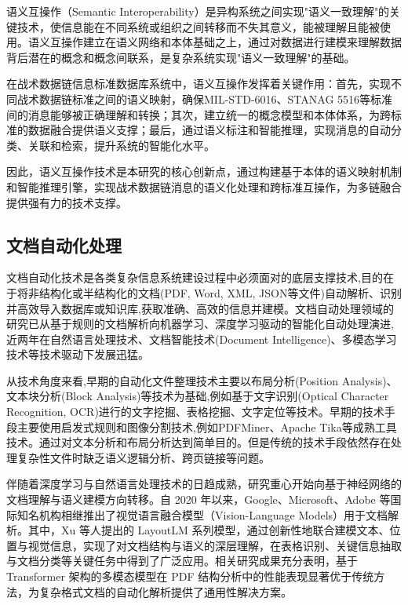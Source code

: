 语义互操作（Semantic Interoperability）是异构系统之间实现"语义一致理解"的关键技术，使信息能在不同系统或组织之间转移而不失其意义，能被理解且能被使用。语义互操作建立在语义网络和本体基础之上，通过对数据进行建模来理解数据背后潜在的概念和概念间联系，是复杂系统实现"语义一致理解"的基础。

在战术数据链信息标准数据库系统中，语义互操作发挥着关键作用：首先，实现不同战术数据链标准之间的语义映射，确保MIL-STD-6016、STANAG 5516等标准间的消息能够被正确理解和转换；其次，建立统一的概念模型和本体体系，为跨标准的数据融合提供语义支撑；最后，通过语义标注和智能推理，实现消息的自动分类、关联和检索，提升系统的智能化水平。

因此，语义互操作技术是本研究的核心创新点，通过构建基于本体的语义映射机制和智能推理引擎，实现战术数据链消息的语义化处理和跨标准互操作，为多链融合提供强有力的技术支撑。


\subsection{文档自动化处理}

文档自动化技术是各类复杂信息系统建设过程中必须面对的底层支撑技术,目的在于将非结构化或半结构化的文档(PDF, Word, XML, JSON等文件)自动解析、识别并高效导入数据库或知识库,获取准确、高效的信息并建模。文档自动处理领域的研究已从基于规则的文档解析向机器学习、深度学习驱动的智能化自动处理演进,近两年在自然语言处理技术、文档智能技术(Document Intelligence)、多模态学习技术等技术驱动下发展迅猛。

从技术角度来看,早期的自动化文件整理技术主要以布局分析(Position Analysis)、文本块分析(Block Analysis)等技术为基础,例如基于文字识别(Optical Character Recognition, OCR)进行的文字挖掘、表格挖掘、文字定位等技术。早期的技术手段主要使用启发式规则和图像分割技术,例如PDFMiner、Apache Tika等成熟工具技术。通过对文本分析和布局分析达到简单目的。但是传统的技术手段依然存在处理复杂性文件时缺乏语义逻辑分析、跨页链接等问题。

伴随着深度学习与自然语言处理技术的日趋成熟，研究重心开始向基于神经网络的文档理解与语义建模方向转移。自 2020 年以来，Google、Microsoft、Adobe 等国际知名机构相继推出了视觉语言融合模型（Vision-Language Models）用于文档解析。其中，Xu 等人提出的 LayoutLM 系列模型\cite{Xu2020LayoutLM,Huang2022LayoutLMv3}，通过创新性地联合建模文本、位置与视觉信息，实现了对文档结构与语义的深层理解，在表格识别、关键信息抽取与文档分类等关键任务中得到了广泛应用。相关研究成果充分表明，基于 Transformer 架构的多模态模型在 PDF 结构分析中的性能表现显著优于传统方法，为复杂格式文档的自动化解析提供了通用性解决方案。

